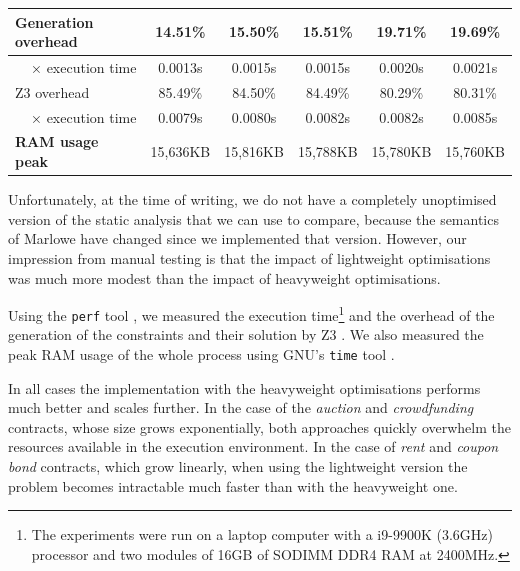 \documentclass[english,runningheads]{llncs}
\begin{document}
\begin{table}[]
{\begin{tabular}{l||lllll}
Generation overhead                    & \multicolumn{1}{c|}{14.51\%}  & \multicolumn{1}{c|}{15.50\%}  & \multicolumn{1}{c|}{15.51\%}  & \multicolumn{1}{c|}{19.71\%}  & \multicolumn{1}{c}{19.69\%} \\ \hline
\multicolumn{1}{r||}{× execution time} & \multicolumn{1}{c|}{0.0013s}  & \multicolumn{1}{c|}{0.0015s}  & \multicolumn{1}{c|}{0.0015s}  & \multicolumn{1}{c|}{0.0020s}  & \multicolumn{1}{c}{0.0021s} \\ \hline
Z3 overhead                            & \multicolumn{1}{c|}{85.49\%}  & \multicolumn{1}{c|}{84.50\%}  & \multicolumn{1}{c|}{84.49\%}  & \multicolumn{1}{c|}{80.29\%}  & \multicolumn{1}{c}{80.31\%} \\ \hline
\multicolumn{1}{r||}{× execution time} & \multicolumn{1}{c|}{0.0079s}  & \multicolumn{1}{c|}{0.0080s}  & \multicolumn{1}{c|}{0.0082s}  & \multicolumn{1}{c|}{0.0082s}  & \multicolumn{1}{c}{0.0085s} \\ \hline
\textbf{RAM usage peak}                & \multicolumn{1}{c|}{15,636KB} & \multicolumn{1}{c|}{15,816KB} & \multicolumn{1}{c|}{15,788KB} & \multicolumn{1}{c|}{15,780KB} & \multicolumn{1}{c}{15,760KB}
\end{tabular}
}
\vspace*{-0.6cm}
\end{table}


\noindent
Unfortunately, at the time of writing, we do not have a completely unoptimised
version of the static analysis that we can use to compare, because the semantics
of Marlowe have changed since we implemented that version. However, our impression
from manual testing is that the impact of lightweight optimisations was much more modest than the impact of heavyweight optimisations.

Using the \texttt{perf} tool \cite{perf}, we measured the execution
time\footnote{The experiments were run on a laptop computer with a
i9-9900K (3.6GHz) processor and two modules of 16GB of SODIMM DDR4 RAM at 2400MHz.}
and the overhead of the generation of the constraints and their solution
by Z3 \cite{de2008z3}. We also measured the peak RAM usage of the whole
process using GNU's \texttt{time} tool \cite{keppel1998gnu}.

In all cases the implementation with the heavyweight optimisations
performs much better and scales further. In the case of the \textit{auction}
and \textit{crowdfunding} contracts, whose size grows exponentially, both
approaches quickly overwhelm the resources available in the execution environment.
In the case of \textit{rent} and \textit{coupon bond} contracts,
which grow linearly, when using the lightweight version the problem becomes 
intractable much faster than with the heavyweight one.
\end{document}
